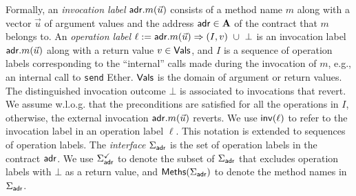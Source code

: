 

Formally, an \emph{invocation label} $\mathsf{adr}.m(\vec{u})$ consists of a method name $m$ along
with a vector $\vec{u}$ of argument values and the address $\mathsf{adr} \in \mathbf{A}$ of the contract that $m$ belongs to. An \emph{operation label} $\ell :=
\mathsf{adr}.m(\vec{u}) \Rightarrow (I,v) \ \cup\ \bot$ is an invocation label $\mathsf{adr}.m(\vec{u})$ along with a
return value $v \in \mathsf{Vals}$, and $I$ is a sequence of operation labels corresponding to the ``internal'' calls made during the invocation of $m$, e.g., an internal call to {\tt send} Ether. 
$\mathsf{Vals}$ is the domain of argument or return values. The distinguished invocation outcome $\bot$ is associated to invocations that revert. 
We assume w.l.o.g. that the preconditions are satisfied for all the operations in $I$, otherwise, the external invocation $\mathsf{adr}.m(\vec{u})$ reverts. We use $\mathsf{inv}({\ell})$ to refer to the invocation label in an operation label $\ell$. This notation is extended to sequences of operation labels. The \emph{interface} $\Sigma_{\mathsf{adr}}$ is the set of operation labels in the contract $\mathsf{adr}$. 
We use $\Sigma_{\mathsf{adr}}^{\checkmark}$ to denote the subset of $\Sigma_{\mathsf{adr}}$ that excludes operation labels with $\bot$ as a return value, and $\mathsf{Meths}({\Sigma_{\mathsf{adr}}})$ to denote the method names in $\Sigma_{\mathsf{adr}}$. 



